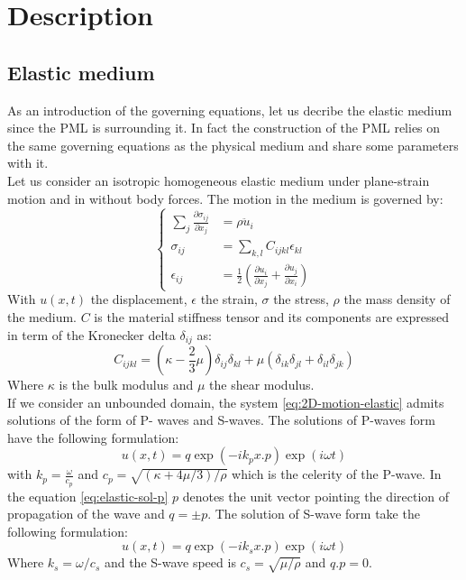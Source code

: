 \section{Description}

\subsection{Elastic medium}
As an introduction of the governing equations, let us decribe the elastic medium since the PML is surrounding it. In fact the construction of the PML relies on the same governing equations as the physical medium and share some parameters with it.\\
Let us consider an isotropic homogeneous elastic medium under plane-strain motion and in without body forces. The motion in the medium is governed by:
\begin{equation}
\begin{cases}
\sum_{j} \frac{\partial \sigma_{ij}}{\partial x_j} & =  \rho \ddot{u}_i \\
\sigma_{ij} &= \sum_{k,l} C_{ijkl} \epsilon_{kl} \\
\epsilon_{ij} &= \frac{1}{2} \left(\frac{\partial u_{i}}{\partial x_j} + \frac{\partial u_{j}}{\partial x_i} \right)
\end{cases}
\label{eq:2D-motion-elastic}
\end{equation} 
With $u(x,t)$ the displacement, $\epsilon$ the strain, $\sigma$ the stress, $\rho$ the mass density of the medium. $C$ is the material stiffness tensor and its components are expressed in term of the Kronecker delta $\delta_{ij}$ as:
\begin{equation}
C_{ijkl} = (\kappa-\frac{2}{3}\mu)\delta_{ij}\delta_{kl}+\mu(\delta_{ik}\delta_{jl} + \delta_{il} \delta_{jk})
\end{equation} 
Where $\kappa$ is the bulk modulus and $\mu$ the shear modulus.\\
If we consider an unbounded domain, the system \ref{eq:2D-motion-elastic} admits solutions of the form of P- waves and S-waves. The solutions of P-waves form have the following formulation: 
\begin{equation}
u(x,t) = q \exp(-i k_p x . p) \exp(i\omega t)
\label{eq:elastic-sol-p}
\end{equation}
with $k_p = \frac{\omega}{c_p}$ and $c_p = \sqrt{(\kappa+4\mu/3)/\rho}$ which is the celerity of the P-wave. In the equation \ref{eq:elastic-sol-p} $p$ denotes the unit vector pointing the direction of propagation of the wave and $q=\pm p$.   
The solution of S-wave form take the following formulation:
\begin{equation}
u(x,t) = q \exp(-i k_s x.p) \exp(i \omega t)
\end{equation}
Where $k_s = \omega / c_s$ and the S-wave speed is $c_s =\sqrt{ \mu/\rho}$ and $q.p =0$.
